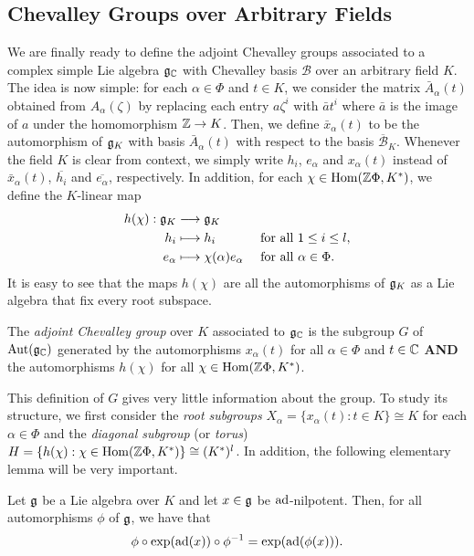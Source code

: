 \subsection{Chevalley Groups over Arbitrary Fields}

We are finally ready to define the adjoint Chevalley groups associated to a complex simple Lie algebra $\mathfrak{g}_{\mathbb{C}}$ with Chevalley basis $\mathcal{B}$ over an arbitrary field $K$. 
The idea is now simple: for each $\alpha\in\Phi$ and $t\in K$, we consider the matrix $\bar{A}_\alpha(t)$ obtained from $A_\alpha(\zeta)$ by replacing each entry $a\zeta^i$ with $\bar{a}t^i$ where $\bar{a}$ is the image of $a$ under the homomorphism $\mathbb{Z}\to K$. 
Then, we define $\bar{x}_\alpha(t)$ to be the automorphism of $\mathfrak{g}_K$ with basis $\bar{A}_\alpha(t)$ with respect to the basis $\overline{\mathcal{B}}_K$. Whenever the field $K$ is clear from context, we simply write $h_i$, $e_\alpha$ and $x_\alpha(t)$ instead of $\bar{x}_\alpha(t)$, $\overline{h_i}$ and $\overline{e_\alpha}$, respectively. In addition, for each $\chi\in\mathrm{Hom}(\mathbb{Z}\Phi,K^*)$, we define the $K$-linear map
\begin{align*}
    h(\chi):\mathfrak{g}_K& \longrightarrow\mathfrak{g}_K\\
    h_i & \longmapsto h_i\hspace{1.23cm} \text{for all } 1\leq i \leq l,\\
    e_\alpha & \longmapsto \chi(\alpha) e_\alpha \quad\text{ for all } \alpha\in\Phi.
\end{align*}
It is easy to see that the maps $h(\chi)$ are all the automorphisms of $\mathfrak{g}_K$ as a Lie algebra that fix every root subspace.

\begin{definition}\label{def:chevgroup}
    The \textit{adjoint Chevalley group} over $K$ associated to $\mathfrak{g}_{\mathbb{C}}$ is the subgroup $G$ of $\mathrm{Aut}(\mathfrak{g}_{\mathbb{C}})$ generated by the automorphisms $x_\alpha(t)$ for all $\alpha\in\Phi$ and $t\in\mathbb{C}$ \textbf{AND} the automorphisms $h(\chi)$ for all $\chi\in\mathrm{Hom}(\mathbb{Z}\Phi, K^*)$.
\end{definition}

This definition of $G$ gives very little information about the group. To study its structure, we first consider the \textit{root subgroups} $X_\alpha=\{x_\alpha(t):t\in K\}\cong K$ for each $\alpha\in\Phi$ and the \textit{diagonal subgroup} (or \textit{torus}) $H=\{h(\chi):\chi\in\mathrm{Hom}(\mathbb{Z}\Phi,K^*)\}\cong (K^*)^l$. In addition, the following elementary lemma will be very important. 

\begin{lemma}\label{lem:conjxalpla}
    Let $\mathfrak{g}$ be a Lie algebra over $K$ and let $x\in\mathfrak{g}$ be $\mathrm{ad}$-nilpotent. Then, for all automorphisms $\phi$ of $\mathfrak{g}$, we have that 
    $$\phi\circ\exp(\mathrm{ad}(x))\circ\phi^{-1}=\exp(\mathrm{ad}(\phi(x))).$$
\end{lemma}

